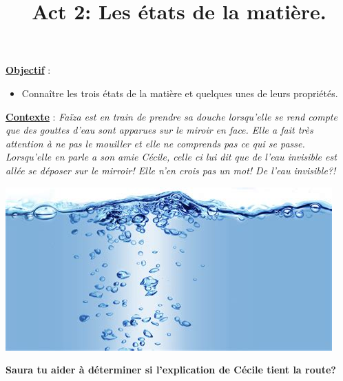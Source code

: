 \documentclass[10pt]{article}
\newcommand{\titreActivite}{Act 2: Les états de la matière.} %
\newcommand{\objectif}{ 	
	\begin{itemize}
		\item Connaître les trois états de la matière et quelques unes de leurs propriétés.
	\end{itemize}
} %
\newcommand{\contexte}{
	Faïza est en train de prendre sa douche lorsqu'elle se rend compte que 
	des gouttes d'eau sont apparues sur le miroir en face.
	Elle a fait très attention à ne pas le mouiller et elle ne comprends pas ce qui se passe.
	Lorsqu'elle en parle a son amie Cécile, celle ci lui dit que de l'eau invisible est allée 
	se déposer sur le mirroir! Elle n'en crois pas un mot! De l'eau invisible?!
}
\newcommand{\resumeContexte}{Saura tu aider à déterminer si l'explication de Cécile tient la route?}
\begin{document}
\date{}
\title{\titreActivite}
\maketitle %

\underline{\textbf{Objectif}} :  \vspace{2pt}
\objectif

\vspace{10pt}

\begin{minipage}[c]{0.45\textwidth}
	\justify \underline{\textbf{Contexte}} :  \textit{\contexte}
\end{minipage}
\hspace{ 0pt}
\begin{minipage}[c]{0.45\textwidth}
	\centering \includegraphics[width=0.7\columnwidth]{activite.jpeg} %
\end{minipage}
\vspace{15pt}


	

\textbf{\resumeContexte}
\vspace{-12pt}




\begin{question}
\end{question} 
\end{document}

